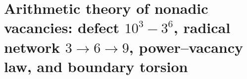 \HMTFlushCurrentChapter
\chapter{Arithmetic theory of nonadic vacancies: defect \texorpdfstring{\(10^3-3^6\)}{10^3-3^6}, radical network \(3\to6\to9\), power--vacancy law, and boundary torsion}%
\begingroup
\renewcommand{\chapter}[2][]{}%
%
\endgroup

\HMTFlushCurrentChapter
\chapter{Thermal constants and radiation: Boltzmann, Wien, Stefan--Boltzmann and spectral thermodynamics of the photon gas}%
\begingroup
\renewcommand{\chapter}[2][]{}%
%
\endgroup

\HMTFlushCurrentChapter
\chapter{Electroweak constants and mixing: angular determinant, relation \(W/Z\), Weinberg angle and rational CKM reflection}%
\begingroup
\renewcommand{\chapter}[2][]{}%
%
\endgroup

\HMTFlushCurrentChapter
\chapter{Intrinsic derivation of \(G\) and contragredient reciprocity \texorpdfstring{\(G\leftrightarrow\hbar\)}{G<->hbar}: phase closure, Compton and Planck scales, and invariance of \(G\hbar\)}%
\begingroup
\renewcommand{\chapter}[2][]{}%
%
\endgroup


